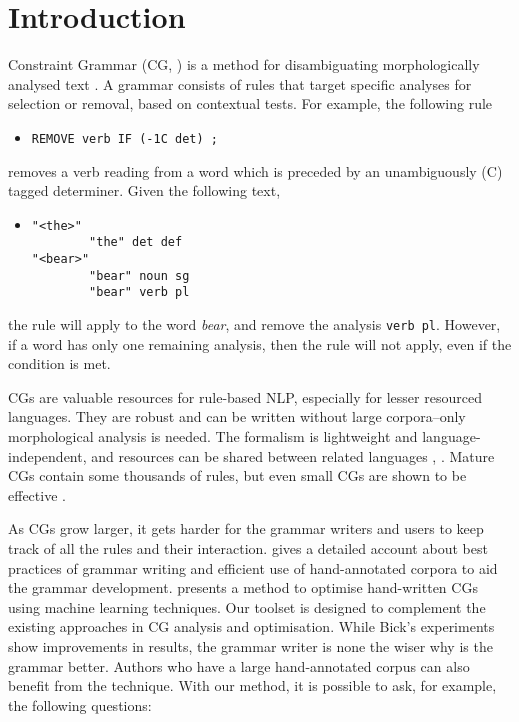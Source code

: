 \section{Introduction}
\label{sec:intro}

Constraint Grammar (CG, \cite{karlsson1995constraint})
is a method for disambiguating morphologically analysed text%
. 
A grammar consists of rules that target specific analyses for selection or removal, based on contextual tests. For example, the following rule
\begin{itemize}
\item[] \texttt{REMOVE verb IF (-1C det) ;}
\end{itemize}
removes a verb reading from a word which is preceded by an unambiguously (C) tagged determiner.
Given the following text,
\begin{itemize}
\item[] 
\begin{verbatim}
"<the>"
        "the" det def
"<bear>"
        "bear" noun sg
        "bear" verb pl
\end{verbatim}
\end{itemize}
the rule will apply to the word \emph{bear}, and remove the analysis \texttt{verb pl}.
However, if a word has only one remaining analysis, then the rule will not apply, even if the condition is met.

CGs are valuable resources for rule-based NLP, especially for lesser resourced languages. They are robust and can be written without large corpora--only morphological analysis is needed. The formalism is lightweight and language-independent, and resources can be shared between related languages \cite{bick2006spanish}, \cite{lene_trond_linda2010}.
Mature CGs contain some thousands of rules, but even small CGs are shown to be effective \cite{lene_trond2011}.

As CGs grow larger, it gets harder for the grammar writers and users to keep track of all the rules and their interaction.
\cite{voutilainen2004} gives a detailed account about best practices of grammar writing and efficient use of hand-annotated corpora to aid the grammar development.
\cite{bick2013tuning} presents a method to optimise hand-written CGs using machine learning techniques.
Our toolset is designed to complement the existing approaches in CG analysis and optimisation.
While Bick's experiments show improvements in results, the grammar writer is none the wiser why is the grammar better.
Authors who have a large hand-annotated corpus can also benefit from the technique.
With our method, it is possible to ask, for example, the following questions:


